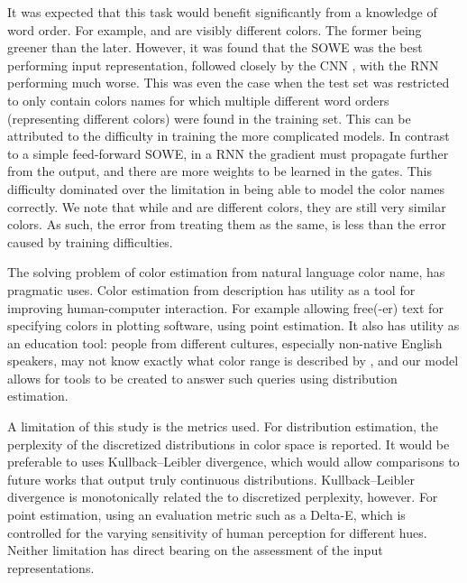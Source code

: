 \documentclass{book}
\begin{document}
It was expected that this task would benefit significantly from a knowledge of word order.
For example,  and  are visibly different colors.
The former being greener than the later.
However, it was found that the SOWE was the best performing input representation, 
followed closely by the CNN , with the RNN performing much worse.
This was even the case when the test set was restricted to only contain colors names for which multiple different word orders (representing different colors) were found in the training set.
This can be attributed to the difficulty in training the more complicated models.
In contrast to a simple feed-forward SOWE, in a RNN the gradient must propagate further from the output,
and there are more weights to be learned in the gates.
This difficulty dominated over the limitation in being able to model the color names correctly.
We note that while  and  are different colors, they are still very similar colors.
As such, the error from treating them as the same, is less than the error caused by training difficulties.


The solving problem of color estimation from natural language color name, has pragmatic uses.
Color estimation from description has utility as a tool for improving human-computer interaction.
For example allowing free(-er) text for specifying colors in plotting software, using point estimation.
It also has utility as an education tool: people from different cultures, especially non-native English speakers, may not know exactly what color range is described by , and our model allows for tools to be created to answer such queries using distribution estimation.


A limitation of this study is the metrics used.
For distribution estimation, the perplexity of the discretized distributions in color space is reported.
It would be preferable to uses Kullback–Leibler divergence, which would allow comparisons to future works that output truly continuous distributions.
Kullback–Leibler divergence is monotonically related the to discretized perplexity, however.
For point estimation, using an evaluation metric such as a Delta-E, which is controlled for the varying sensitivity of human perception for different hues.
Neither limitation has direct bearing on the assessment of the input representations.



\end{document}
